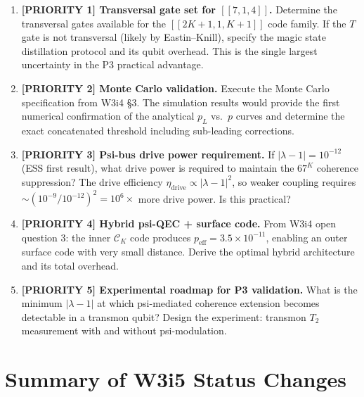 \documentclass[11pt]{article}
\theoremstyle{definition}
\theoremstyle{remark}
\begin{document}
\begin{enumerate}

\item \textbf{[PRIORITY 1] Transversal gate set for $[[7,1,4]]$.}
  Determine the transversal gates available for the $[[2K+1,1,K+1]]$
  code family.  If the $T$ gate is not transversal (likely by Eastin--Knill),
  specify the magic state distillation protocol and its qubit overhead.
  This is the single largest uncertainty in the P3 practical advantage.

\item \textbf{[PRIORITY 2] Monte Carlo validation.}
  Execute the Monte Carlo specification from W3i4 \S3.  The simulation
  results would provide the first numerical confirmation of the analytical
  $p_L$ vs.\ $p$ curves and determine the exact concatenated threshold
  including sub-leading corrections.

\item \textbf{[PRIORITY 3] Psi-bus drive power requirement.}
  If $|\lambda-1| = 10^{-12}$ (ESS first result), what drive power is
  required to maintain the $67^K$ coherence suppression?  The drive
  efficiency $\eta_{\mathrm{drive}} \propto |\lambda-1|^2$, so weaker
  coupling requires $\sim (10^{-9}/10^{-12})^2 = 10^6\times$ more drive
  power.  Is this practical?

\item \textbf{[PRIORITY 4] Hybrid psi-QEC + surface code.}
  From W3i4 open question 3: the inner $\mathcal{C}_K$ code produces
  $p_{\mathrm{eff}} = 3.5\times10^{-11}$, enabling an outer surface code
  with very small distance.  Derive the optimal hybrid architecture and
  its total overhead.

\item \textbf{[PRIORITY 5] Experimental roadmap for P3 validation.}
  What is the minimum $|\lambda-1|$ at which psi-mediated coherence
  extension becomes detectable in a transmon qubit?  Design the experiment:
  transmon $T_2$ measurement with and without psi-modulation.

\end{enumerate}

\section*{Summary of W3i5 Status Changes}
\end{document}
